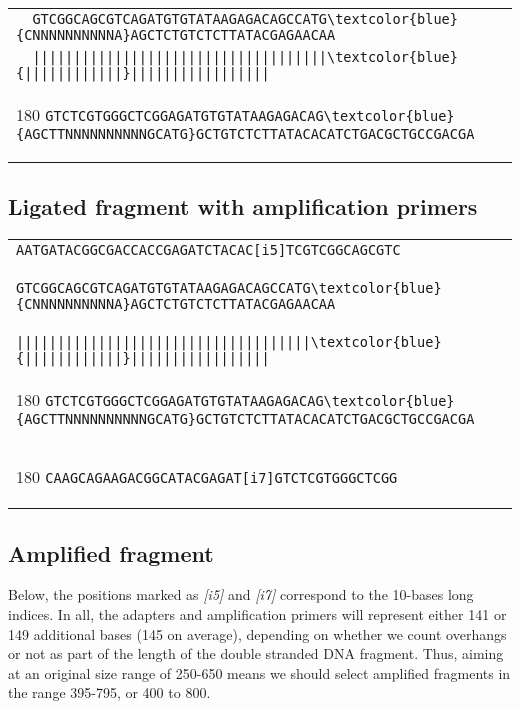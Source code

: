 \documentclass[a4paper,12pt]{article}
\begin{document}
\begin{flushleft}
\begin{tabular}{l}
\Verb+  GTCGGCAGCGTCAGATGTGTATAAGAGACAGCCATG\textcolor{blue}{CNNNNNNNNNNA}AGCTCTGTCTCTTATACGAGAACAA+\\[-6pt]
\Verb+  ||||||||||||||||||||||||||||||||||||\textcolor{blue}{||||||||||||}|||||||||||||||||+\\[-10pt]
   \begin{turn}{180}
   \Verb+GTCTCGTGGGCTCGGAGATGTGTATAAGAGACAG\textcolor{blue}{AGCTTNNNNNNNNNNGCATG}GCTGTCTCTTATACACATCTGACGCTGCCGACGA+
   \end{turn}
\\
\end{tabular}
\vspace*{0.3cm}

\subsection*{Ligated fragment with amplification primers}
\begin{tabular}{l}
\Verb+AATGATACGGCGACCACCGAGATCTACAC[i5]TCGTCGGCAGCGTC+\\[-8pt]
\Verb+                                   GTCGGCAGCGTCAGATGTGTATAAGAGACAGCCATG\textcolor{blue}{CNNNNNNNNNNA}AGCTCTGTCTCTTATACGAGAACAA+\\[-6pt]
\Verb+                                   ||||||||||||||||||||||||||||||||||||\textcolor{blue}{||||||||||||}|||||||||||||||||+\\[-10pt]
   \begin{turn}{180}
   \Verb+GTCTCGTGGGCTCGGAGATGTGTATAAGAGACAG\textcolor{blue}{AGCTTNNNNNNNNNNGCATG}GCTGTCTCTTATACACATCTGACGCTGCCGACGA                                 +
   \end{turn}
\\[-8pt]
   \begin{turn}{180}
   \Verb+CAAGCAGAAGACGGCATACGAGAT[i7]GTCTCGTGGGCTCGG                                                                                                          +
   \end{turn}
\\
\end{tabular}
\vspace*{0.3cm}

\subsection*{Amplified fragment}
Below, the positions marked as \emph{[i5]} and \emph{[i7]} correspond to the 10-bases long indices. In all, the adapters and amplification primers will represent either 141 or 149 additional bases (145 on average), depending on whether we count overhangs or not as part of the length of the double stranded DNA fragment. Thus, aiming at an original size range of 250-650 means we should select amplified fragments in the range 395-795, or 400 to 800.


\end{flushleft}
\end{document}
